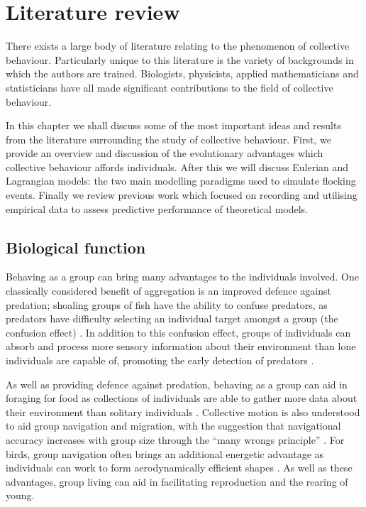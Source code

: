 \graphicspath{{fig/lit_review/}}

\chapter{Literature review}
\label{cha:lit_review}

There exists a large body of literature relating to the phenomenon of
collective behaviour. Particularly unique to this literature is the variety of
backgrounds in which the authors are trained. Biologists, physicists, applied
mathematicians and statisticians have all made significant contributions to the
field of collective behaviour.

In this chapter we shall discuss some of the most important ideas and results
from the literature surrounding the study of collective behaviour. First, we
provide an overview and discussion of the evolutionary advantages which
collective behaviour affords individuals. After this we will discuss Eulerian
and Lagrangian models: the two main modelling paradigms used to simulate
flocking events. Finally we review previous work which focused on recording and
utilising empirical data to assess predictive performance of theoretical
models.

\section{Biological function}
\label{sec:biological_function}

Behaving as a group can bring many advantages to the individuals involved. One
classically considered benefit of aggregation is an improved defence against
predation; shoaling groups of fish have the ability to confuse predators, as
predators have difficulty selecting an individual target amongst a group (the
confusion effect) \parencite{landeau86}. In addition to this confusion effect,
groups of individuals can absorb and process more sensory information about
their environment than lone individuals are capable of, promoting the early
detection of predators \parencite{pitcher93}.

As well as providing defence against predation, behaving as a group can aid in
foraging for food as collections of individuals are able to gather more data
about their environment than solitary individuals \parencite{clark86}.
Collective motion is also understood to aid group navigation and migration,
with the suggestion that navigational accuracy increases with group size
through the ``many wrongs principle'' \parencite{simmons04}. For birds, group
navigation often brings an additional energetic advantage as individuals can
work to form aerodynamically efficient shapes \parencite{weimerskirch01}. As
well as these advantages, group living can aid in facilitating reproduction and
the rearing of young.

